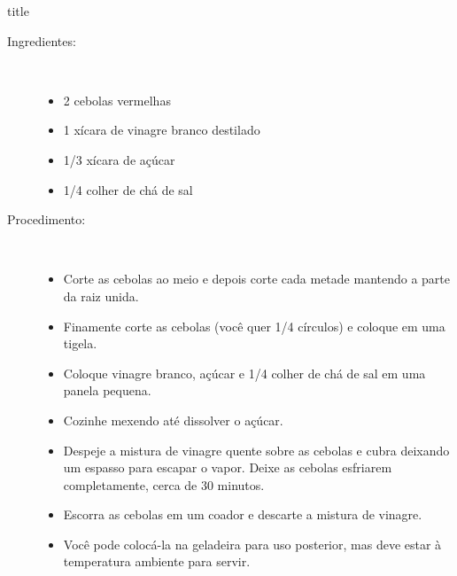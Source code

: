 \documentclass [11pt, papel de carta] {article}
\begin{document}
 {title}

\begin {description}

\item [Ingredientes:] \ \\
\begin {itemize}
\item 2 cebolas vermelhas
\item 1 xícara de vinagre branco destilado
\item 1/3 xícara de açúcar
\item 1/4 colher de chá de sal
\end {itemize}

\item [Procedimento:] \ \\
\begin {itemize}
\item Corte as cebolas ao meio e depois corte cada metade mantendo a parte da raiz unida.
\item Finamente corte as cebolas (você quer 1/4 círculos) e coloque em uma tigela.
\item Coloque vinagre branco, açúcar e 1/4 colher de chá de sal em uma panela pequena.
\item Cozinhe mexendo até dissolver o açúcar.
\item Despeje a mistura de vinagre quente sobre as cebolas e cubra deixando um espasso para escapar o vapor. Deixe as cebolas esfriarem completamente, cerca de 30 minutos.
\item Escorra as cebolas em um coador e descarte a mistura de vinagre.
\item Você pode colocá-la na geladeira para uso posterior, mas deve estar à temperatura ambiente para servir.
\end {itemize}
\end {description}
\end{document}
